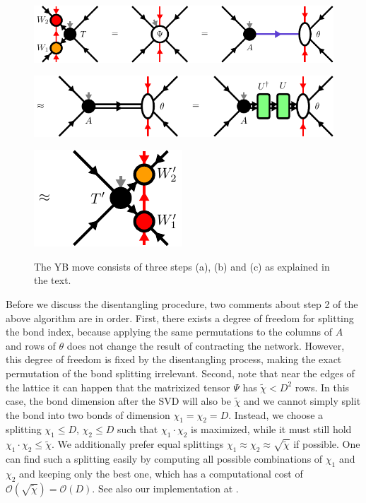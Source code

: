 \begin{figure}
	\centering
	\subcaptionbox{\label{fig:yb_move_svd_disent_a}}
	{%
		\includegraphics[scale=1.0]{figures/tikz/YB_isoTPS/yang_baxter_move_svd/yang_baxter_move_svd_a.pdf}
	}
	\par\bigskip
	\subcaptionbox{\label{fig:yb_move_svd_disent_b}}
	{%
		\includegraphics[scale=1.0]{figures/tikz/YB_isoTPS/yang_baxter_move_svd/yang_baxter_move_svd_b.pdf}
	}
	\par\bigskip
	\subcaptionbox{\label{fig:yb_move_svd_disent_c}}
	{%
		\includegraphics[scale=1.0]{figures/tikz/YB_isoTPS/yang_baxter_move_svd/yang_baxter_move_svd_c.pdf}
	}
	\caption{The YB move consists of three steps (a), (b) and (c) as explained in the text.}
	\label{fig:yb_move_svd_disent}
\end{figure}
Before we discuss the disentangling procedure, two comments about step 2 of the above algorithm are in order. First, there exists a degree of freedom for splitting the bond index, because applying the same permutations to the columns of $A$ and rows of $\theta$ does not change the result of contracting the network. However, this degree of freedom is fixed by the disentangling process, making the exact permutation of the bond splitting irrelevant. Second, note that near the edges of the lattice it can happen that the matrixized tensor $\Psi$ has $\tilde{\chi} < D^2$ rows. In this case, the bond dimension after the SVD will also be $\tilde{\chi}$ and we cannot simply split the bond into two bonds of dimension $\chi_1=\chi_2=D$. Instead, we choose a splitting $\chi_1 \le D$, $\chi_2 \le D$ such that $\chi_1\cdot\chi_2$ is maximized, while it must still hold $\chi_1\cdot\chi_2\le\tilde{\chi}$. We additionally prefer equal splittings $\chi_1\approx\chi_2\approx\sqrt{\tilde{\chi}}$ if possible. One can find such a splitting easily by computing all possible combinations of $\chi_1$ and $\chi_2$ and keeping only the best one, which has a computational cost of $\mathcal{O}\left(\sqrt{\tilde{\chi}}\right) = \mathcal{O}\left(D\right)$. See also our implementation at \cite{cite:github_YB_isoTPS}.\par
